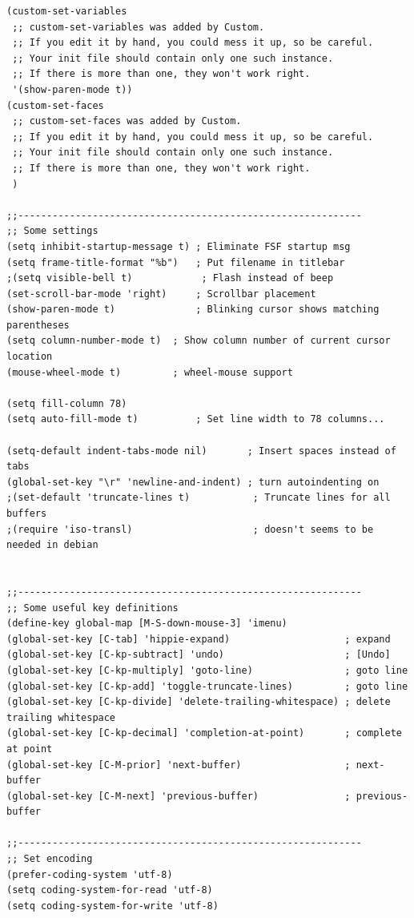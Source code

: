 \documentclass[12pt,spanish,]{article}
\begin{document}
\begin{verbatim}
(custom-set-variables
 ;; custom-set-variables was added by Custom.
 ;; If you edit it by hand, you could mess it up, so be careful.
 ;; Your init file should contain only one such instance.
 ;; If there is more than one, they won't work right.
 '(show-paren-mode t))
(custom-set-faces
 ;; custom-set-faces was added by Custom.
 ;; If you edit it by hand, you could mess it up, so be careful.
 ;; Your init file should contain only one such instance.
 ;; If there is more than one, they won't work right.
 )

;;------------------------------------------------------------
;; Some settings
(setq inhibit-startup-message t) ; Eliminate FSF startup msg
(setq frame-title-format "%b")   ; Put filename in titlebar
;(setq visible-bell t)            ; Flash instead of beep
(set-scroll-bar-mode 'right)     ; Scrollbar placement
(show-paren-mode t)              ; Blinking cursor shows matching parentheses
(setq column-number-mode t)  ; Show column number of current cursor location
(mouse-wheel-mode t)         ; wheel-mouse support

(setq fill-column 78)
(setq auto-fill-mode t)          ; Set line width to 78 columns...

(setq-default indent-tabs-mode nil)       ; Insert spaces instead of tabs
(global-set-key "\r" 'newline-and-indent) ; turn autoindenting on
;(set-default 'truncate-lines t)           ; Truncate lines for all buffers
;(require 'iso-transl)                     ; doesn't seems to be needed in debian


;;------------------------------------------------------------
;; Some useful key definitions
(define-key global-map [M-S-down-mouse-3] 'imenu)
(global-set-key [C-tab] 'hippie-expand)                    ; expand
(global-set-key [C-kp-subtract] 'undo)                     ; [Undo] 
(global-set-key [C-kp-multiply] 'goto-line)                ; goto line
(global-set-key [C-kp-add] 'toggle-truncate-lines)         ; goto line
(global-set-key [C-kp-divide] 'delete-trailing-whitespace) ; delete trailing whitespace
(global-set-key [C-kp-decimal] 'completion-at-point)       ; complete at point
(global-set-key [C-M-prior] 'next-buffer)                  ; next-buffer
(global-set-key [C-M-next] 'previous-buffer)               ; previous-buffer

;;------------------------------------------------------------
;; Set encoding
(prefer-coding-system 'utf-8)
(setq coding-system-for-read 'utf-8)
(setq coding-system-for-write 'utf-8)


\end{verbatim}
\end{document}
